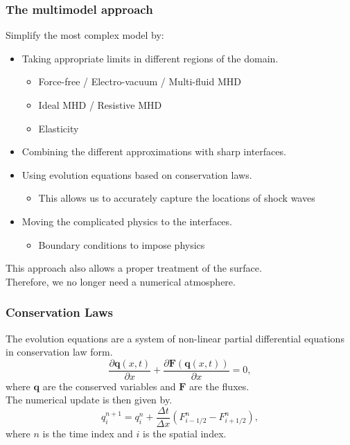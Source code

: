 \documentclass{beamer}
\begin{document}
\begin{frame}
\frametitle{The multimodel approach}
Simplify the most complex model by:
\begin{itemize}
\item{Taking appropriate limits in different regions of the domain.}
\begin{itemize}
\item{Force-free / Electro-vacuum / Multi-fluid MHD}
\item{Ideal MHD / Resistive MHD}
\item{Elasticity}
\end{itemize}
\item{Combining the different approximations with sharp interfaces.}
\item{Using evolution equations based on conservation laws.}
\begin{itemize}
\item{This allows us to accurately capture the locations of shock waves}
\end{itemize}
\item{Moving the complicated physics to the interfaces.}
\begin{itemize}
\item{Boundary conditions to impose physics}
\end{itemize}
\end{itemize}
This approach also allows a proper treatment of the surface. \\
Therefore, we no longer need a numerical atmosphere. 
\end{frame}

%
\begin{frame}
\frametitle{Conservation Laws}
The evolution equations are a system of non-linear partial differential equations in conservation law form.
\begin{equation}
\frac{\partial \mathbf{q}(x,t)}{\partial x}  + \frac{\partial \mathbf{F}(\mathbf{q}(x,t))}{\partial x} = 0,
\end{equation}
where $\mathbf{q}$ are the conserved variables and $\mathbf{F}$ are the fluxes.\\
The numerical update is then given by.
\begin{equation}
q^{n+1}_i = q^n_i + \frac{\Delta t}{\Delta x} \left(F^n_{i-1/2} - F^n_{i+1/2}\right),
\end{equation}
where $n$ is the time index and $i$ is the spatial index.
\end{frame}
\end{document}
